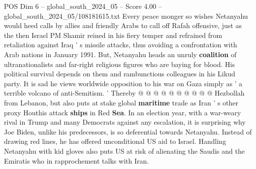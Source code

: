 \begin{textsample}{POS Dim 6 – global\_south\_2024\_05 – Score 4.00 – global\_south\_2024\_05/108181615.txt}
Every peace monger so wishes Netanyahu would heed calls by allies and friendly Arabs to call off Rafah offensive, just as the then Israel PM Shamir reined in his fiery temper and refrained from retaliation against Iraq ' s missile attacks, thus avoiding a confrontation with Arab nations in January 1991.
But, Netanyahu heads an unruly \textbf{coalition} of ultranationalists and far-right religious figures who are baying for blood.
His political survival depends on them and rambunctious colleagues in his Likud party.
It is sad he views worldwide opposition to his war on Gaza simply as ' a terrible volcano of anti-Semitism. ' Thereby @ @ @ @ @ @ @ @ @ @ Hezbollah from Lebanon, but also puts at stake global \textbf{maritime} trade as Iran ' s other proxy Houthis attack \textbf{ships} in Red \textbf{Sea}.
In an election year, with a war-weary rival in Trump and many Democrats against any escalation, it is surprising why Joe Biden, unlike his predecessors, is so deferential towards Netanyahu.
Instead of drawing red lines, he has offered unconditional US aid to Israel.
Handling Netanyahu with kid gloves also puts US at risk of alienating the Saudis and the Emiratis who in rapprochement talks with Iran.

\end{textsample}
